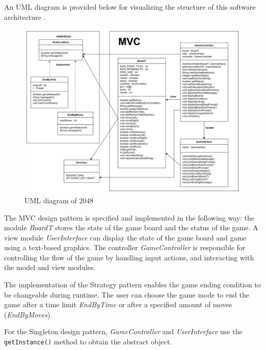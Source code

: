 \documentclass[12pt]{article}
\begin{document}
\bigskip

\noindent An UML diagram is provided below for visualizing the structure of this software architecture \cite{UML}. 

\begin{figure}[hbt!]
  \centering
  \includegraphics[width=1.0\textwidth]{Figures/UML.png}
  \caption{UML diagram of 2048}
\end{figure}

\newpage

\noindent The MVC design pattern is specified and implemented in the following way: the module \textit{BoardT}
stores the state of the game board and the status of the game. A view module \textit{UserInterface} can display
the state of the game board and game using a text-based graphics. The controller \textit{GameController}
is responsible for controlling the flow of the game by handling input actions, and interacting with the model and view modules.

\medskip

\noindent The implementation of the Strategy pattern enables the game ending condition to be changeable during
runtime. The user can choose the game mode to end the game after a time limit \textit{EndByTime} or after a specified amount of moves (\textit{EndByMoves}).

\medskip

\noindent For the Singleton design pattern, \textit{GameController} and \textit{UserInterface} use the \verb|getInstance()| method to obtain the abstract object.

\bigskip
\end{document}

